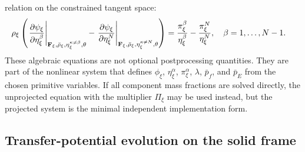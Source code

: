 relation on the constrained tangent space:
\begin{align}
		\rho_\xi
		\left(
		\left.
		\frac{\partial\psi_\xi}{\partial\eta_\xi^\beta}
		\right|_{\mathbf{F}_\xi,\bar\rho_\xi,\eta_\xi^{\kappa\neq\beta},\theta}
		-
		\left.
		\frac{\partial\psi_\xi}{\partial\eta_\xi^N}
		\right|_{\mathbf{F}_\xi,\bar\rho_\xi,\eta_\xi^{\kappa\neq N},\theta}
		\right)
		 & =
		\frac{\pi_\xi^\beta}{\eta_\xi^\beta}
		-\frac{\pi_\xi^N}{\eta_\xi^N},
		\quad \beta=1,\ldots,N-1.
	\label{eq:implementation_pi_difference_system}
\end{align}
These algebraic equations are not optional postprocessing quantities.  They are
part of the nonlinear system that defines \(\phi_\xi\),
\(\eta_\xi^\alpha\), \(\pi_\xi^\alpha\), \(\lambda\), \(\bar p_f\), and
\(\bar p_E\) from the chosen primitive variables.  If all component mass
fractions are solved directly, the unprojected equation with the multiplier
\(\Pi_\xi\) may be used instead, but the projected system is the minimal
independent implementation form.

\subsection{Transfer-potential evolution on the solid frame}
\label{sec:conversion_potential_solid_frame}


